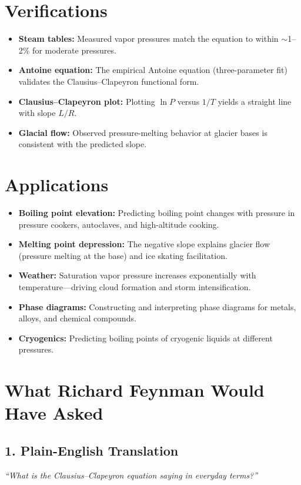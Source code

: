 \documentclass[11pt,openright]{book}
\begin{document}
\section*{Verifications}

\begin{itemize}
\item \textbf{Steam tables:} Measured vapor pressures match the equation to within $\sim$1--2\% for moderate pressures.
\item \textbf{Antoine equation:} The empirical Antoine equation (three-parameter fit) validates the Clausius--Clapeyron functional form.
\item \textbf{Clausius--Clapeyron plot:} Plotting $\ln P$ versus $1/T$ yields a straight line with slope $L/R$.
\item \textbf{Glacial flow:} Observed pressure-melting behavior at glacier bases is consistent with the predicted slope.
\end{itemize}
\section*{Applications}

\begin{itemize}
\item \textbf{Boiling point elevation:} Predicting boiling point changes with pressure in pressure cookers, autoclaves, and high-altitude cooking.
\item \textbf{Melting point depression:} The negative slope explains glacier flow (pressure melting at the base) and ice skating facilitation.
\item \textbf{Weather:} Saturation vapor pressure increases exponentially with temperature---driving cloud formation and storm intensification.
\item \textbf{Phase diagrams:} Constructing and interpreting phase diagrams for metals, alloys, and chemical compounds.
\item \textbf{Cryogenics:} Predicting boiling points of cryogenic liquids at different pressures.
\end{itemize}
\section*{What Richard Feynman Would Have Asked}

\subsection*{1. Plain-English Translation}
\textit{``What is the Clausius--Clapeyron equation saying in everyday terms?''}
\end{document}
